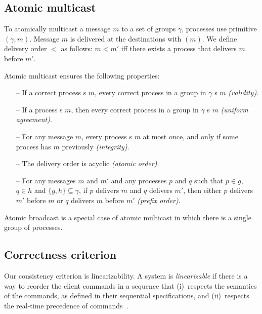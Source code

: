 \subsection{Atomic multicast}
\label{sec:amcast}

To atomically multicast a message $m$ to a set of groups $\gamma$, processes use primitive \amcast$(\gamma, m)$.
Message $m$ is delivered at the destinations with \amdel$(m)$.
We define delivery order $<$ as follows: $m < m'$ iff there exists a process that delivers $m$ before $m'$. 

Atomic multicast ensures the following properties:

\begin{itemize}
    
    \item[--] If a correct process \amcast{}s $m$, every correct process in a group in $\gamma$ \amdel{}s $m$ \emph{(validity)}.
    
    \item[--] If a process \amdel{}s $m$, then every correct process in a group in $\gamma$ \amdel{}s $m$ \emph{(uniform agreement)}.
    
    \item[--] For any message $m$, every process \amdel{}s $m$ at most once, and only if some process has \amcast{} $m$ previously \emph{(integrity)}.
    
    \item[--] The delivery order is acyclic \emph{(atomic order)}.

    \item[--] For any messages $m$ and $m'$ and any processes $p$ and $q$ such that $p \in g$, $q \in h$ and $\{ g, h \} \subseteq \gamma$, if $p$ delivers $m$ and $q$ delivers $m'$, then either $p$ delivers $m'$ before $m$ or $q$ delivers $m$ before $m'$ \emph{(prefix order)}.
    
\end{itemize}

Atomic broadcast is a special case of atomic multicast in which there is a single group of processes.


\subsection{Correctness criterion}

Our consistency criterion is linearizability.
A system is \emph{linearizable} if there is a way to reorder the client commands in a sequence that (i)~respects the semantics of the commands, as defined in their sequential specifications, and (ii)~respects the real-time precedence of commands~\cite{Attiya04}.




